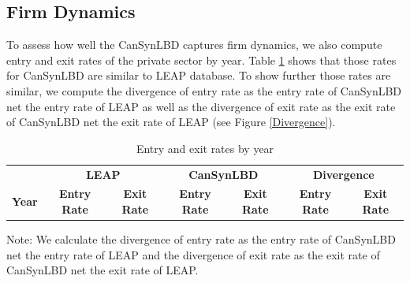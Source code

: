 \documentclass{article}
\begin{document}
\subsection{Firm Dynamics}
To assess how well the CanSynLBD captures firm dynamics, we also compute entry and exit rates of the private sector by year. Table \ref{FirmDynamics} shows that those rates for CanSynLBD are similar to LEAP database. To show further those rates are similar, we compute the divergence of entry rate as the entry rate of CanSynLBD net the entry rate of LEAP as well as the divergence of exit rate as the exit rate of CanSynLBD net the exit rate of LEAP (see Figure \ref{Divergence}).

\begin{table}[H]
  \centering
\begin{threeparttable}
 \caption{Entry and exit rates by year} \label{FirmDynamics} \medskip
\renewcommand{\arraystretch}{1}
\begin{tabular}{l|c c| c c| c c}
\toprule
&\multicolumn{2}{c|}{\textbf{LEAP}} &  \multicolumn{2}{c|}{\textbf{CanSynLBD}}&  \multicolumn{2}{c}{\textbf{Divergence}}\\
\textbf{Year}&\textbf{Entry Rate}&\textbf{Exit Rate}&\textbf{Entry Rate}&\textbf{Exit Rate} &\textbf{Entry Rate}&\textbf{Exit Rate}\\
\midrule

   \bottomrule
  \end{tabular} 
\begin{tablenotes}
\small
\item Note: \TableNote  We calculate the divergence of entry rate as the entry rate of CanSynLBD net the entry rate of LEAP and the divergence of exit rate as the exit rate of CanSynLBD net the exit rate of LEAP.
 \end{tablenotes}
 \end{threeparttable}
\end{table}
\end{document}
